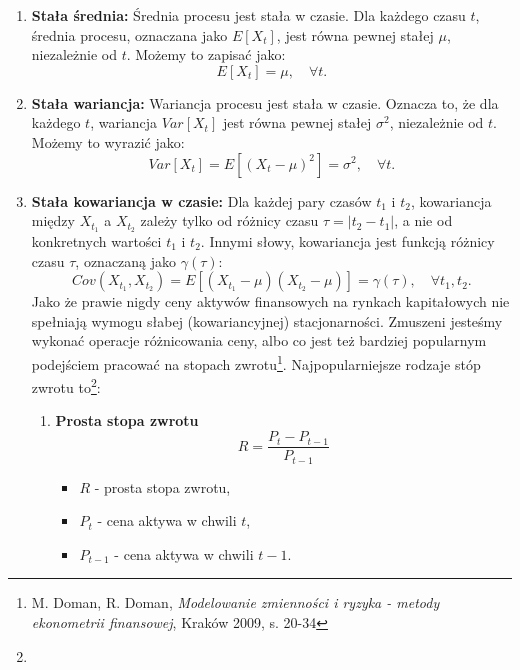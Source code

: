 \begin{enumerate}
  \item \textbf{Stała średnia:} Średnia procesu jest stała w czasie. Dla każdego czasu \( t \), średnia procesu, oznaczana jako \( E[X_t] \), jest równa pewnej stałej \( \mu \), niezależnie od \( t \). Możemy to zapisać jako:
  \begin{equation}
  E[X_t] = \mu, \quad \forall t.
  \end{equation}
  
  \item \textbf{Stała wariancja:} Wariancja procesu jest stała w czasie. Oznacza to, że dla każdego \( t \), wariancja \( Var[X_t] \) jest równa pewnej stałej \( \sigma^2 \), niezależnie od \( t \). Możemy to wyrazić jako:
  \begin{equation}
  Var[X_t] = E[(X_t - \mu)^2] = \sigma^2, \quad \forall t.
  \end{equation}

  \item \textbf{Stała kowariancja w czasie:} Dla każdej pary czasów \( t_1 \) i \( t_2 \), kowariancja między \( X_{t_1} \) a \( X_{t_2} \) zależy tylko od różnicy czasu \( \tau = |t_2 - t_1| \), a nie od konkretnych wartości \( t_1 \) i \( t_2 \). Innymi słowy, kowariancja jest funkcją różnicy czasu \( \tau \), oznaczaną jako \( \gamma(\tau) \):
  \begin{equation}
  Cov(X_{t_1}, X_{t_2}) = E[(X_{t_1} - \mu)(X_{t_2} - \mu)] = \gamma(\tau), \quad \forall t_1, t_2.
  \end{equation}
Jako że prawie nigdy ceny aktywów finansowych na rynkach kapitałowych nie spełniają wymogu słabej (kowariancyjnej) stacjonarności. Zmuszeni jesteśmy wykonać operacje różnicowania ceny, albo co jest też bardziej popularnym podejściem pracować na stopach zwrotu\footnote{M. Doman, R. Doman, \textit{Modelowanie zmienności i ryzyka - metody ekonometrii finansowej}, Kraków 2009, s. 20-34}. Najpopularniejsze rodzaje stóp zwrotu to\footnote{}:
\begin{enumerate}
 \item \textbf{Prosta stopa zwrotu}
 \begin{equation}
 R = \frac{P_t - P_{t-1}}{P_{t-1}}
 \end{equation}
 \begin{itemize}
  \item \( R \) - prosta stopa zwrotu,
  \item \( P_t \) - cena aktywa w chwili \( t \),
  \item \( P_{t-1} \) - cena aktywa w chwili \( t-1 \).
 \end{itemize}


\end{enumerate}
\end{enumerate}
